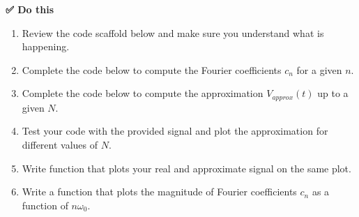 \textbf{✅ Do this}

\begin{enumerate}
\def\labelenumi{\arabic{enumi}.}
\tightlist
\item
  Review the code scaffold below and make sure you understand what is
  happening.
\item
  Complete the code below to compute the Fourier coefficients \(c_n\)
  for a given \(n\).
\item
  Complete the code below to compute the approximation \(V_{approx}(t)\)
  up to a given \(N\).
\item
  Test your code with the provided signal and plot the approximation for
  different values of \(N\).
\item
  Write function that plots your real and approximate signal on the same
  plot.
\item
  Write a function that plots the magnitude of Fourier coefficients
  \(c_n\) as a function of \(n\omega_0\).
\end{enumerate}

\begin{Shaded}
\begin{Highlighting}[]

    
    

\OperatorTok{=}  \OperatorTok{/}
\OperatorTok{=}\OperatorTok{=}\NormalTok{)}

        

\OperatorTok{=}  \OperatorTok{*}
\end{Highlighting}
\end{Shaded}

